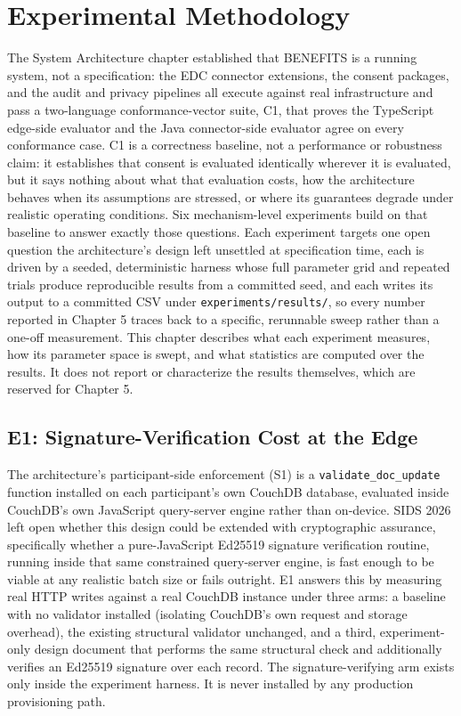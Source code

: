 \section{Experimental Methodology}

The System Architecture chapter established that BENEFITS is a running system, not a specification: the EDC connector extensions, the consent packages, and the audit and privacy pipelines all execute against real infrastructure and pass a two-language conformance-vector suite, C1, that proves the TypeScript edge-side evaluator and the Java connector-side evaluator agree on every conformance case. C1 is a correctness baseline, not a performance or robustness claim: it establishes that consent is evaluated identically wherever it is evaluated, but it says nothing about what that evaluation costs, how the architecture behaves when its assumptions are stressed, or where its guarantees degrade under realistic operating conditions. Six mechanism-level experiments build on that baseline to answer exactly those questions. Each experiment targets one open question the architecture's design left unsettled at specification time, each is driven by a seeded, deterministic harness whose full parameter grid and repeated trials produce reproducible results from a committed seed, and each writes its output to a committed CSV under \texttt{experiments/results/}, so every number reported in Chapter 5 traces back to a specific, rerunnable sweep rather than a one-off measurement. This chapter describes what each experiment measures, how its parameter space is swept, and what statistics are computed over the results. It does not report or characterize the results themselves, which are reserved for Chapter 5.

\subsection{E1: Signature-Verification Cost at the Edge}

The architecture's participant-side enforcement (S1) is a \texttt{validate\_doc\_update} function installed on each participant's own CouchDB database, evaluated inside CouchDB's own JavaScript query-server engine rather than on-device. SIDS 2026 left open whether this design could be extended with cryptographic assurance, specifically whether a pure-JavaScript Ed25519 signature verification routine, running inside that same constrained query-server engine, is fast enough to be viable at any realistic batch size or fails outright. E1 answers this by measuring real HTTP writes against a real CouchDB instance under three arms: a baseline with no validator installed (isolating CouchDB's own request and storage overhead), the existing structural validator unchanged, and a third, experiment-only design document that performs the same structural check and additionally verifies an Ed25519 signature over each record. The signature-verifying arm exists only inside the experiment harness. It is never installed by any production provisioning path.

